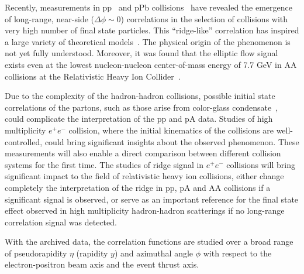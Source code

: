 Recently, measurements in pp~\cite{Khachatryan:2010gv} and pPb collisions~\cite{CMS:2012qk,Abelev:2012ola,Aad:2012gla} have revealed the emergence of long-range, near-side ($\Delta\phi\sim 0$) correlations in the selection of collisions with very high number of final state particles. This ``ridge-like'' correlation has inspired a large variety of theoretical models~\cite{Bzdak:2013zma,Dusling:2015gta}. The physical origin of the phenomenon is not yet fully understood. Moreover, it was found that the elliptic flow signal exists even at the lowest nucleon-nucleon center-of-mass energy of 7.7 GeV in AA collisions at the Relativistic Heavy Ion Collider~\cite{Adamczyk:2012ku}. 

Due to the complexity of the hadron-hadron collisions, possible initial state correlations of the partons, such as those arise from color-glass condensate~\cite{Gelis:2010nm, Dusling:2013qoz}, could complicate the interpretation of the pp and pA data. Studies of high multiplicity $e^+e^-$ collision, where the initial kinematics of the collisions are well-controlled, could bring significant insights about the observed phenomenon. These measurements will also enable a direct comparison between different collision systems for the first time. The studies of ridge signal in $e^+e^-$ collisions will bring significant impact to the field of relativistic heavy ion collisions, either change completely the interpretation of the ridge in pp, pA and AA collisions if a significant signal is observed, or serve as an important reference for the final state effect observed in high multiplicity hadron-hadron scatterings if no long-range correlation signal was detected. 

With the archived data, the correlation functions are studied over a broad range of pseudorapidity $\eta$ (rapidity $y$) and azimuthal angle $\phi$ with respect to the electron-positron beam axis and the event thrust axis. 

